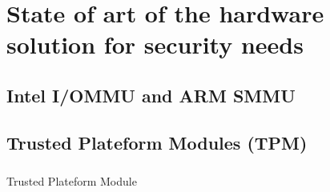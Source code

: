 
\chapter{State of art of the hardware solution for security needs}

\section{Intel I/OMMU and ARM SMMU}

\section{Trusted Plateform Modules (TPM)}

\paragraph{}
Trusted Plateform Module
